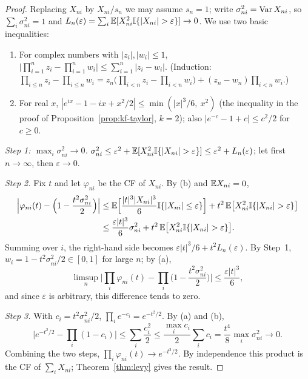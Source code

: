 \documentclass[main.tex]{subfiles}
\begin{document}
\begin{proof}
Replacing $X_{ni}$ by $X_{ni}/s_n$ we may assume $s_n=1$; write $\sigma_{ni}^2=\operatorname{Var} X_{ni}$, so $\sum_i\sigma_{ni}^2=1$ and $L_n(\varepsilon)=\sum_i\E[X_{ni}^2\I\{|X_{ni}|>\varepsilon\}]\to0$. We use two basic inequalities:
\begin{enumerate}
  \item[(a)] For complex numbers with $|z_i|,|w_i|\le1$, $\big|\prod_{i=1}^nz_i-\prod_{i=1}^nw_i\big|\le\sum_{i=1}^n|z_i-w_i|$. (Induction: $\prod_{i\le n}z_i-\prod_{i\le n}w_i=z_n\big(\prod_{i<n}z_i-\prod_{i<n}w_i\big)+(z_n-w_n)\prod_{i<n}w_i$.)
  \item[(b)] For real $x$, $|e^{ix}-1-ix+x^2/2|\le\min(|x|^3/6,\ x^2)$ (the inequality in the proof of Proposition~\ref{prop:kf-taylor}, $k=2$); also $|e^{-c}-1+c|\le c^2/2$ for $c\ge0$.
\end{enumerate}
\emph{Step 1: $\max_i\sigma_{ni}^2\to0$.} $\sigma_{ni}^2\le\varepsilon^2+\E[X_{ni}^2\I\{|X_{ni}|>\varepsilon\}]\le\varepsilon^2+L_n(\varepsilon)$; let first $n\to\infty$, then $\varepsilon\to0$.

\emph{Step 2.} Fix $t$ and let $\varphi_{ni}$ be the CF of $X_{ni}$. By (b) and $\mathbb{E} X_{ni}=0$,
\begin{align*}
\Big|\varphi_{ni}(t)-\Big(1-\frac{t^2\sigma_{ni}^2}{2}\Big)\Big|
&\le\E\Big[\frac{|t|^3|X_{ni}|^3}{6}\I\{|X_{ni}|\le\varepsilon\}\Big]+t^2\,\E\big[X_{ni}^2\I\{|X_{ni}|>\varepsilon\}\big]\\
&\le\frac{\varepsilon|t|^3}{6}\sigma_{ni}^2+t^2\,\E\big[X_{ni}^2\I\{|X_{ni}|>\varepsilon\}\big].
\end{align*}
Summing over $i$, the right-hand side becomes $\varepsilon|t|^3/6+t^2L_n(\varepsilon)$. By Step~1, $w_i=1-t^2\sigma_{ni}^2/2\in[0,1]$ for large $n$; by (a),
\[
\limsup_n\Big|\prod_i\varphi_{ni}(t)-\prod_i\Big(1-\frac{t^2\sigma_{ni}^2}{2}\Big)\Big|\le\frac{\varepsilon|t|^3}{6},
\]
and since $\varepsilon$ is arbitrary, this difference tends to zero.

\emph{Step 3.} With $c_i=t^2\sigma_{ni}^2/2$, $\prod_ie^{-c_i}=e^{-t^2/2}$. By (a) and (b),
\[
\Big|e^{-t^2/2}-\prod_i(1-c_i)\Big|\le\sum_i\frac{c_i^2}{2}\le\frac{\max_ic_i}{2}\sum_ic_i=\frac{t^4}{8}\max_i\sigma_{ni}^2\to0 .
\]
Combining the two steps, $\prod_i\varphi_{ni}(t)\to e^{-t^2/2}$. By independence this product is the CF of $\sum_iX_{ni}$; Theorem~\ref{thm:levy} gives the result.
\end{proof}
\end{document}
